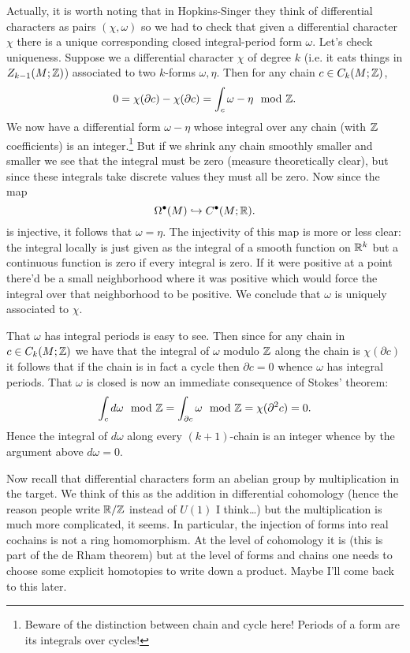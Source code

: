 \documentclass{amsart}
\begin{document}
Actually, it is worth noting that in Hopkins-Singer
they think of differential characters as pairs $(\chi,\omega)$ so we had to
check that given a differential character $\chi$ there is a unique corresponding
closed integral-period form $\omega$. Let's check uniqueness. Suppose we a differential
character $\chi$ of degree $k$ (i.e. it eats things in $Z_{k-1}(M;\mathbb{Z})$) associated to
two $k$-forms $\omega,\eta$. Then for any chain $c\in C_k(M;\mathbb{Z})$,
\begin{equation*}
    0 = \chi(\partial c) - \chi(\partial c) = \int_c \omega-\eta \mod{\mathbb{Z}}.
\end{equation*}
We now have a differential form $\omega-\eta$ whose integral over any chain
(with $\mathbb{Z}$ coefficients) is an integer.\footnote{Beware of the distinction between
chain and cycle here! Periods of a form are its integrals over cycles!}
But if we
shrink any chain smoothly smaller and smaller we see that the integral must be zero
(measure theoretically clear),
but since these integrals take discrete values they must all be zero. 
Now since the map 
\begin{equation*}
    \Omega^\bullet(M) \hookrightarrow C^\bullet(M;\mathbb{R}).
\end{equation*}
is injective, it follows that $\omega=\eta$.
The injectivity of this map is more or less clear: the integral locally is just given
as the integral of a smooth function on $\mathbb{R}^k$ but a continuous function is zero if every
integral is zero. If it were positive at a point there'd be a small neighborhood where it
was positive which would force the integral over that neighborhood to be positive.
We conclude that $\omega$ is uniquely associated to $\chi$.

That $\omega$ has integral periods is easy to see. Then
since for any chain in $c\in C_k(M;\mathbb{Z})$ we have that the integral of $\omega$ modulo $\mathbb{Z}$
along the chain is $\chi(\partial c)$ it follows that if the chain is in fact a cycle
then $\partial c=0$ whence $\omega$ has integral periods.
That $\omega$ is closed is now an immediate consequence of Stokes' theorem:
\begin{equation*}
    \int_c d\omega \mod {\mathbb{Z}}= \int_{\partial c}\omega \mod{\mathbb{Z}}= \chi(\partial^2 c)=0.
\end{equation*}
Hence the integral of $d\omega$ along every $(k+1)$-chain is an integer whence by the argument
above $d\omega=0$.

Now recall that differential
characters form an abelian group by multiplication in the target. We think of
this as the addition in differential cohomology (hence the reason people write
$\mathbb{R}/\mathbb{Z}$ instead of $U(1)$ I think\ldots) but the multiplication is much more complicated,
it seems. In particular, the injection of forms into real cochains is not a ring
homomorphism. At the level of cohomology it is (this is part of the de Rham theorem)
but at the level of forms and chains one needs to choose some explicit homotopies
to write down a product. Maybe I'll come back to this later.
\end{document}

